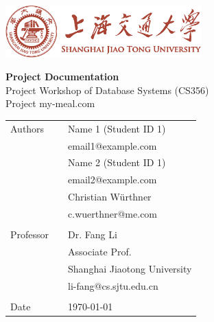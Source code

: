 \begin{titlepage}
\pagestyle{empty}

\begin{center}
\includegraphics[height=2cm]{content/graphics/sjtubannerred.pdf}
\end{center}

\vspace{20 mm}

\begin{center}
{\fontsize{28}{28} \selectfont
\textbf{Project Documentation}}\\[5mm] 
{\fontsize{16}{22}
\selectfont Project Workshop of Database Systems (CS356)\\Project my-meal.com}
\end{center}

\vfill
\begin{tabular}{lcl}
Authors     &&    Name 1 (Student ID 1)\\ 
            &&    email1@example.com\\
            &&    Name 2 (Student ID 1)\\
            &&    email2@example.com\\
            &&    Christian Würthner\\
            &&    c.wuerthner@me.com\\\\
Professor   &&    Dr. Fang Li\\ 
            &&    Associate Prof.\\
            &&    Shanghai Jiaotong University\\
            &&    li-fang@cs.sjtu.edu.cn\\\\
Date	        &&    \today\\ 
\end{tabular}
\end{titlepage}